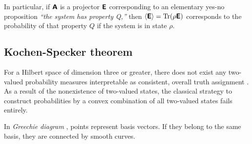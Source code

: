 In particular, if $\textsf{\textbf{A}}$ is a projector $\textsf{\textbf{E}}$ corresponding to an elementary yes-no proposition
{\it ``the system has property Q,''} then $\langle \textsf{\textbf{E}}\rangle = \textrm{Tr}({  \rho}  \textsf{\textbf{E}})$ corresponds
to the probability of that property $Q$ if the system is in state ${  \rho}$.




\subsection{Kochen-Specker theorem}
\label{2011-m-KST}

For a Hilbert space of dimension three or greater,
there does not exist any
two-valued probability measures interpretable as consistent, overall truth assignment
\cite{specker-60,kochen1}.
As a result of the nonexistence of two-valued states, the classical strategy
to construct probabilities by a convex combination of all two-valued states fails entirely.

In  {\em Greechie diagram} \cite{greechie:71},
points  represent basis vectors.
If they belong to the same basis, they are connected by  smooth curves.

